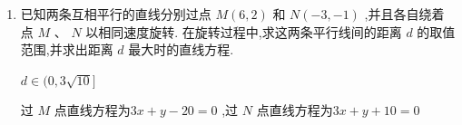 \begin{enumerate}
\begin{jieda}
\begin{enumerate}
\begin{enumerate}
                设$\angle BAC$的角分线上点为$P(x, y)$，则有$\dfrac{|x + {2y} - 4|}{\sqrt{5}} = \dfrac{|x - y + 2|}{\sqrt{2}}$，故直线为$\dfrac{x + {2y} - 4}{\sqrt{5}} = \dfrac{x - y + 2}{\sqrt{2}}$或$\dfrac{x + {2y} - 4}{\sqrt{5}} = -\dfrac{x - y + 2}{\sqrt{2}}$

                数形结合可知$\angle {BAC}$ 的角平分线所在直线的方程的斜率小于0，因此直线方程为$\dfrac{x + {2y} - 4}{\sqrt{5}} = -\dfrac{x - y + 2}{\sqrt{2}}$，整理得$y =  - \left( {3 + \sqrt{10}}\right) x + 2$.

                \item 方法2

                $\vv{AB} = (2, -1)$，$\vv{AC} = (-4, -4)$，两者对应的单位向量为$\left(\dfrac{2\sqrt{5}}{5}, -\dfrac{\sqrt{5}}{5}\right)$和$\left(-\dfrac{\sqrt{2}}{2}, -\dfrac{\sqrt{2}}{2}\right)$，故角分线所在直线的方向向量为$\left(4\sqrt{5}-5\sqrt{2}, -(2\sqrt{5}+5\sqrt{2})\right)$，可得法向量为$(2\sqrt{5}+5\sqrt{2}, 4\sqrt{5}-5\sqrt{2})$，因此直线方程为$(2\sqrt{5}+5\sqrt{2})x+(4\sqrt{5}-5\sqrt{2})(y-2) = 0$，即$y =  - \left( {3 + \sqrt{10}}\right) x + 2$
            \end{enumerate}
            \item 容易判断$\angle ABC$的角分线为$y = 1$，故根据角分线的交点是内心可得内心的坐标为$\left( {\sqrt{10} - 3,1}\right)$
            \item 根据$\vv{AB} = (2, -1)$，$\vv{AC} = (-4, -4)$可知$S = \dfrac{1}{2}\left|2 \times (-4) - (-1)\times (-4)\right| = 6$.
        \end{enumerate}
    \end{jieda}
    
    \item 已知两条互相平行的直线分别过点 $M\left( {6,2}\right)$ 和 $N\left( {-3, - 1}\right)$ ,并且各自绕着点 ${M}$ 、 ${N}$ 以相同速度旋转. 在旋转过程中,求这两条平行线间的距离 $d$ 的取值范围,并求出距离 $d$ 最大时的直线方程.
    \begin{jieda}
        $d \in  (0,3\sqrt{10}\rbrack$
        
        过 ${M}$ 点直线方程为${3x} + y - {20} = 0$ ,过 ${N}$ 点直线方程为${3x} + y + {10} = 0$
    \end{jieda}
    

\end{enumerate}
